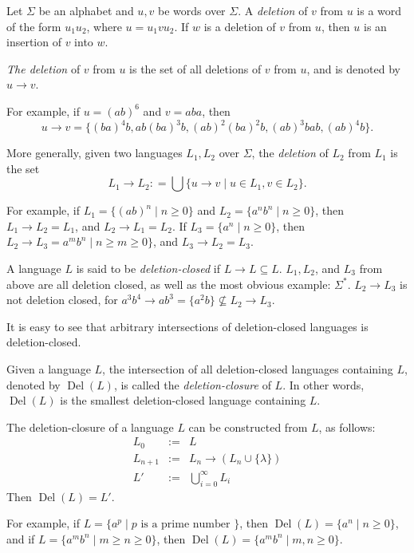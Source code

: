 \documentclass[12pt]{article}
\begin{document}
Let $\Sigma$ be an alphabet and $u,v$ be words over $\Sigma$.  A \emph{deletion} of $v$ from $u$ is a word of the form $u_1u_2$, where $u=u_1vu_2$.  If $w$ is a deletion of $v$ from $u$, then $u$ is an insertion of $v$ into $w$.

\emph{The deletion} of $v$ from $u$ is the set of all deletions of $v$ from $u$, and is denoted by $u \longrightarrow v$.

For example, if $u=(ab)^6$ and $v=aba$, then $$u\longrightarrow v = \lbrace (ba)^4b, ab(ba)^3b, (ab)^2(ba)^2b, (ab)^3bab, (ab)^4 b\rbrace.$$

More generally, given two languages $L_1,L_2$ over $\Sigma$, the \emph{deletion} of $L_2$ from $L_1$ is the set $$L_1 \longrightarrow L_2: = \bigcup \lbrace u\longrightarrow v\mid u \in L_1, v\in L_2 \rbrace.$$

For example, if $L_1=\lbrace (ab)^n \mid n \ge 0\rbrace$ and $L_2 = \lbrace a^n b^n \mid n \ge 0\rbrace$, then $L_1 \longrightarrow L_2 = L_1$, and $L_2 \longrightarrow L_1 = L_2$.  If $L_3 = \lbrace a^n \mid n\ge 0\rbrace$, then $L_2 \longrightarrow L_3 = a^m b^n \mid n\ge m \ge 0 \rbrace$, and $L_3 \longrightarrow L_2 = L_3$.

A language $L$ is said to be \emph{deletion-closed} if $L \longrightarrow L \subseteq L$.  $L_1,L_2$, and $L_3$ from above are all deletion closed, as well as the most obvious example: $\Sigma^*$.  $L_2\longrightarrow L_3$ is not deletion closed, for $a^3b^4 \longrightarrow ab^3 = \lbrace a^2b \rbrace \nsubseteq L_2\longrightarrow L_3$.

It is easy to see that arbitrary intersections of deletion-closed languages is deletion-closed.

Given a language $L$, the intersection of all deletion-closed languages containing $L$, denoted by $\operatorname{Del}(L)$, is called the \emph{deletion-closure} of $L$.  In other words, $\operatorname{Del}(L)$ is the smallest deletion-closed language containing $L$.

The deletion-closure of a language $L$ can be constructed from $L$, as follows:
\begin{eqnarray*}
L_0 &:=& L \\
L_{n+1} &:=& L_n \longrightarrow (L_n \cup \lbrace \lambda \rbrace) \\
L' &:=& \bigcup_{i=0}^{\infty} L_i
\end{eqnarray*}
Then $\operatorname{Del}(L) = L'$.

For example, if $L=\lbrace a^p \mid p \mbox{ is a prime number }\rbrace$, then $\operatorname{Del}(L)=\lbrace a^n \mid n\ge 0 \rbrace$, and if $L=\lbrace a^m b^n \mid m\ge n\ge 0\rbrace$, then $\operatorname{Del}(L)=\lbrace a^m b^n \mid m,n\ge 0 \rbrace$.
\end{document}
